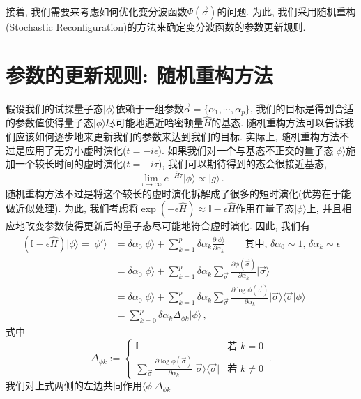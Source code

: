 \documentclass[10pt]{article}
\newcommand{\qket}{\rangle}
\newcommand{\qbar}{\langle}
\begin{document}
接着, 我们需要来考虑如何优化变分波函数$\Psi(\vec{\sigma})$的问题. 
为此, 我们采用随机重构(Stochastic Reconfiguration)的方法来确定变分波函数的参数更新规则. 

\section{参数的更新规则: 随机重构方法}

假设我们的试探量子态$\lvert\phi\qket$依赖于一组参数$\vec{\alpha}=\{\alpha_{1}, \cdots, \alpha_{p}\}$, 我们的目标是得到合适的参数值使得量子态$\lvert\phi\qket$尽可能地逼近哈密顿量$\hat{H}$的基态. 
随机重构方法可以告诉我们应该如何逐步地来更新我们的参数来达到我们的目标. 
实际上, 随机重构方法不过是应用了无穷小虚时演化($t=-i\epsilon$).
如果我们对一个与基态不正交的量子态$\lvert\phi\qket$施加一个较长时间的虚时演化($t=-i\tau$), 我们可以期待得到的态会很接近基态, 
\[ \lim_{\tau\rightarrow\infty}e^{-\hat{H}\tau} \lvert\phi\qket \propto \lvert g\qket\,. \]
随机重构方法不过是将这个较长的虚时演化拆解成了很多的短时演化(优势在于能做近似处理). 
为此, 我们考虑将$\exp{(-\epsilon\hat{H})}\approx\mathbb{I}-\epsilon\hat{H}$作用在量子态$\lvert\phi\qket$上, 并且相应地改变参数使得更新后的量子态尽可能地符合虚时演化. 
因此, 我们有
\begin{align}
(\mathbb{I}-\epsilon\hat{H})\lvert\phi\qket = \lvert\phi'\qket & = \delta\alpha_{0}\lvert\phi\qket + \sum_{k=1}^{p}\delta\alpha_{k}\frac{\partial\lvert\phi\qket}{\partial\alpha_{k}} \qquad{} \text{其中, $\delta\alpha_{0}\sim 1$, $\delta\alpha_{k}\sim\epsilon$} \nonumber \\
& = \delta\alpha_{0}\lvert\phi\qket + \sum_{k=1}^{p} \delta\alpha_{k} \sum_{\vec{\sigma}} \frac{\partial\phi(\vec{\sigma})}{\partial\alpha_{k}} \lvert\vec{\sigma}\qket \nonumber \\
& = \delta\alpha_{0}\lvert\phi\qket + \sum_{k=1}^{p} \delta\alpha_{k} \sum_{\vec{\sigma}} \frac{\partial\log{\phi(\vec{\sigma})}}{\partial\alpha_{k}} \lvert\vec{\sigma}\qket\qbar\vec{\sigma}\vert\phi\qket \nonumber \\ 
& = \sum_{k=0}^{p} \delta\alpha_{k} \Delta_{\phi k} \lvert\phi\qket\,,
\end{align}
式中
\[ \Delta_{\phi k} := \begin{cases} \mathbb{I} & \text{若 } k = 0\\ \sum_{\vec{\sigma}}\frac{\partial\log\phi(\vec{\sigma})}{\partial\alpha_k}\lvert\vec{\sigma}\qket\qbar\vec{\sigma}\rvert & \text{若 } k \neq 0 \end{cases}\,. \]
我们对上式两侧的左边共同作用$\qbar\phi\rvert\Delta_{\phi k}$
\end{document}
